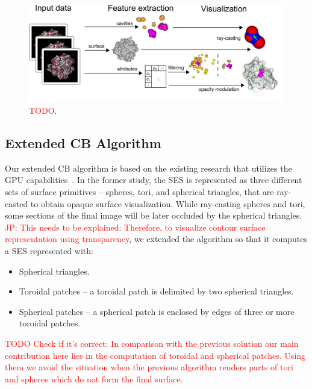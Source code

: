 \begin{figure}[htb]
  \centering
  \includegraphics[width=7.3in]{image/overview.png}
  \caption{\textcolor{red}{TODO}.}
	\label{fig:overview}
\end{figure}

\subsection{Extended CB Algorithm}
\label{sec:ecb}
Our extended CB algorithm is based on the existing research that utilizes the GPU capabilities~\cite{krone2011parallel}.
In the former study, the SES is represented as three different sets of surface primitives -- spheres, tori, and spherical triangles, that are ray-casted to obtain opaque surface visualization. 
While ray-casting spheres and tori, some sections of the final image will be later occluded by the spherical triangles.
\textcolor{red}{JP: This needs to be explained: Therefore, to visualize contour surface representation using transparency}, we extended the algorithm so that it computes a SES represented with:
\begin{itemize}
	\item Spherical triangles.
  \item Toroidal patches -- a toroidal patch is delimited by two spherical triangles.
	\item Spherical patches -- a spherical patch is enclosed by edges of three or more toroidal patches.
\end{itemize}

\textcolor{red}{TODO Check if it's correct: In comparison with the previous solution our main contribution here lies in the computation of toroidal and spherical patches.
Using them we avoid the situation when the previous algorithm renders parts of tori and spheres which do not form the final surface.}

